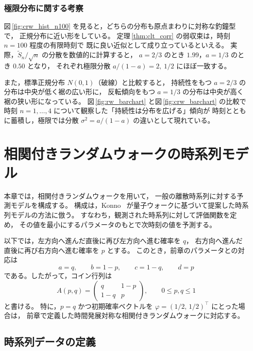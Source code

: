 \documentclass[a4j,dvipdfmx]{jsarticle}
\theoremstyle{plainnote}
\begin{document}
\subsubsection*{極限分布に関する考察}

図\,\ref{fig:crw_hist_n100} を見ると，どちらの分布も原点まわりに対称な釣鐘型で，
正規分布に近い形をしている。
定理\,\ref{thm:clt_corr} の弱収束は，時刻 $n=100$ 程度の有限時刻で
既に良い近似として成り立っているといえる。
実際，$\tilde{S}_n/\sqrt{n}$ の分散を数値的に計算すると，
$a=2/3$ のとき $1.99$，$a=1/3$ のとき $0.50$ となり，
それぞれ極限分散 $a/(1-a)=2,\ 1/2$ にほぼ一致する。

また，標準正規分布 $N(0,1)$（破線）と比較すると，
持続性をもつ $a=2/3$ の分布は中央が低く裾の広い形に，
反転傾向をもつ $a=1/3$ の分布は中央が高く裾の狭い形になっている。
図\,\ref{fig:rw_barchart} と図\,\ref{fig:crw_barchart} の比較で
時刻 $n=1,\ldots,4$ について観察した「持続性は分布を広げる」傾向が
時刻とともに蓄積し，極限では分散 $\sigma^2 = a/(1-a)$ の違いとして現れている。





\newpage
\section{相関付きランダムウォークの時系列モデル}

本章では，相関付きランダムウォークを用いて，
一般の離散時系列に対する予測モデルを構成する。
構成は，Konno~\cite{ref3} が量子ウォークに基づいて提案した時系列モデルの方法に倣う。
すなわち，観測された時系列に対して評価関数を定め，
その値を最小にするパラメータのもとで次時刻の値を予測する。

以下では，左方向へ進んだ直後に再び左方向へ進む確率を $q$，
右方向へ進んだ直後に再び右方向へ進む確率を $p$ とする。
このとき，前章のパラメータとの対応は
\[
  a=q,\qquad b=1-p,\qquad c=1-q,\qquad d=p
\]
である。したがって，コイン行列は
\begin{equation}
  A(p,q)
  =
  \begin{pmatrix}
    q & 1-p \\
    1-q & p
  \end{pmatrix},
  \qquad 0\leq p,q\leq 1
  \label{eq:A_pq_model}
\end{equation}
と書ける。
特に，$p=q$ かつ初期確率ベクトルを $\varphi=(1/2,\,1/2)^\top$ にとった場合は，
前章で定義した時間発展対称な相関付きランダムウォークに対応する。

\subsection{時系列データの定義}
\end{document}
